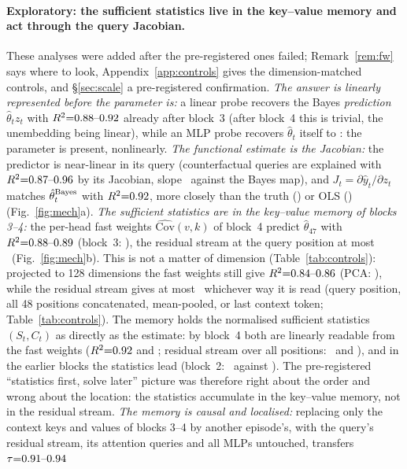 \paragraph{Exploratory: the sufficient statistics live in the key--value memory and act through the query Jacobian.}
These analyses were added after the pre-registered ones failed; Remark~\ref{rem:fw} says where to look,
Appendix~\ref{app:controls} gives the dimension-matched controls, and \S\ref{sec:scale} a pre-registered confirmation.
\emph{The answer is linearly represented before the parameter is:} a linear probe recovers the Bayes \emph{prediction}
$\hat\theta_tz_t$ with $R^2{=}0.88\mbox{--}0.92$ already after block~3 (after block~4 this is trivial, the unembedding being
linear), while an MLP probe recovers $\hat\theta_t$ itself to \AmlpTheta: the parameter is present, nonlinearly. \emph{The functional estimate is the Jacobian:} the predictor is near-linear in its query
(counterfactual queries are explained with $R^2{=}0.87\mbox{--}0.96$ by its Jacobian, slope \AcfSlope\ against the Bayes map), and
$J_t{=}\partial\hat y_t/\partial z_t$ matches $\hat\theta^{\rm Bayes}_t$ with $R^2{=}0.92$, more closely than the
truth (\AjacTrue) or OLS (\AjacOLS) (Fig.~\ref{fig:mech}a). \emph{The sufficient statistics are in the key--value memory of blocks 3--4:} the per-head fast
weights $\widehat{\mathrm{Cov}}(v,k)$ of block~4 predict $\hat\theta_{47}$ with $R^2{=}0.88\mbox{--}0.89$ (block~3: \AfwRthree), the
residual stream at the query position at most \AresidR\ (Fig.~\ref{fig:mech}b). This is not a matter of dimension
(Table~\ref{tab:controls}): projected to 128 dimensions the fast weights still give $R^2{=}0.84\mbox{--}0.86$ (PCA: \AcFwPcaTheta),
while the residual stream gives at most \AcResBestTheta\ whichever way it is read (query position, all 48 positions
concatenated, mean-pooled, or last context token; Table~\ref{tab:controls}). The memory holds the
normalised sufficient statistics $(S_t,C_t)$ as directly as the estimate: by block~4 both are linearly readable from
the fast weights ($R^2{=}0.92$ and \AcFwTheta; residual stream over all positions: \AcCtxMom\ and \AcCtxTheta), and
in the earlier blocks the statistics lead (block~2: \AcFwMomBtwo\ against \AcFwThetaBtwo). The pre-registered
``statistics first, solve later'' picture was therefore right about the order and wrong about the location: the
statistics accumulate in the key--value memory, not in the residual stream. \emph{The memory is causal and localised:} replacing only the context keys and values of blocks 3--4 by another
episode's, with the query's residual stream, its attention queries and all MLPs untouched, transfers $\tau{=}0.91\mbox{--}0.94$
